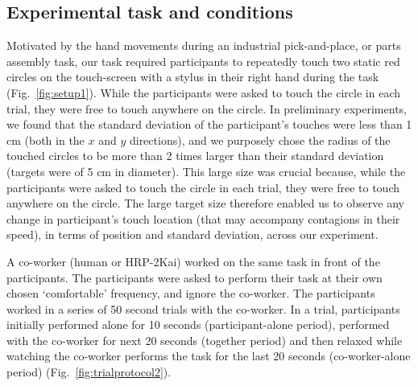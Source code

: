 \subsection{Experimental task and conditions}

Motivated by the hand movements during an industrial pick-and-place, or parts assembly task, our task required participants to repeatedly touch two static red circles on the touch-screen with a stylus in their right hand during the task (Fig.~\ref{fig:setup1}). While the participants were asked to touch the circle in each trial, they were free to touch anywhere on the circle. In preliminary experiments, we found that the standard deviation of the participant's touches were less than 1 cm (both in the $x$ and $y$ directions), and we purposely chose the radius of the touched circles to be more than 2 times larger than their standard deviation (targets were of 5 cm in diameter). This large size was crucial because, while the participants were asked to touch the circle in each trial, they were free to touch anywhere on the circle. The large target size therefore enabled us to observe any change in participant's touch location (that may accompany contagions in their speed), in terms of position and standard deviation, across our experiment. 

A co-worker (human or HRP-2Kai) worked on the same task in front of the participants. The participants were asked to perform their task at their own chosen `comfortable' frequency, and ignore the co-worker. The participants worked in a series of 50 second trials with the co-worker. In a trial, participants initially performed alone for 10 seconds (participant-alone period), performed with the co-worker for next 20 seconds (together period) and then relaxed while watching the co-worker performs the task for the last 20 seconds (co-worker-alone period) (Fig.~\ref{fig:trialprotocol2}).   

